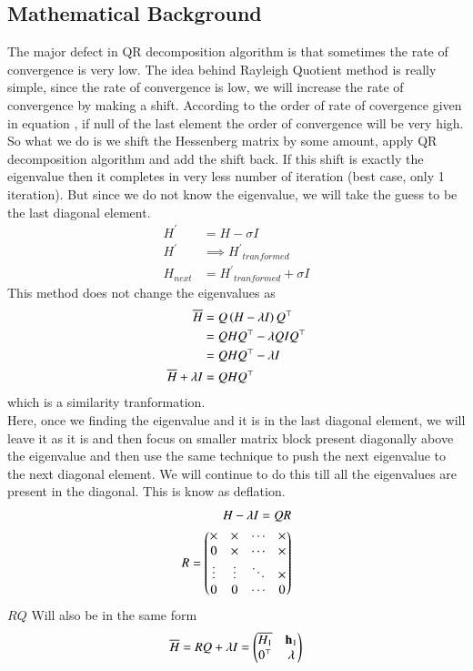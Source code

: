 \documentclass[a4paper,12pt]{article}
\theoremstyle{remark}
\begin{document}
\subsection{Mathematical Background}
The major defect in QR decomposition algorithm is that sometimes the rate of convergence is very low. The idea behind Rayleigh Quotient method is really simple, since the rate of convergence is low, we will increase the rate of convergence by making a shift. According to the order of rate of covergence given in equation , if null of the last element  the order of convergence will be very high. So what we do is we shift the Hessenberg matrix by some amount, apply QR decomposition algorithm and add the shift back. If this shift is exactly the eigenvalue then it completes in very less number of iteration (best case, only 1 iteration). But since we do not know the eigenvalue, we will take the guess to be the last diagonal element.
\begin{align}
	H^\prime &= H - \sigma I\\
	H^\prime &\implies {H^\prime}_{tranformed}\\
	H_{next} &= {H^\prime}_{tranformed} + \sigma I
\end{align}
This method does not change the eigenvalues as
\begin{align}
\overline{H} &= Q\left(H - \lambda I\right)Q^\top\\
	&= QHQ^\top - \lambda QIQ^\top\\
	&= QHQ^\top - \lambda I\\
\overline{H} +\lambda I &= QHQ^\top
\end{align}
which is a similarity tranformation.\\
Here, once we finding the eigenvalue and it is in the last diagonal element, we will leave it as it is and then focus on smaller matrix block present diagonally above the eigenvalue and then use the same technique to push the next eigenvalue to the next diagonal element. We will continue to do this till all the eigenvalues are present in the diagonal. This is know as deflation.
\begin{align}
H  - \lambda I = QR\\
R = \begin{pmatrix}\times & \times & \cdots & \times\\
	0 & \times & \cdots & \times\\
	\vdots & \vdots & \ddots & \times\\
	0 & 0 & \cdots & 0\end{pmatrix}
\end{align}
$RQ$ Will also be in the same form
\begin{align}
\overline{H} = RQ+\lambda I = \begin{pmatrix}\overline{H_1} & \mathbf{h}_1\\0^\top & \lambda\end{pmatrix}
\end{align}
\end{document}
